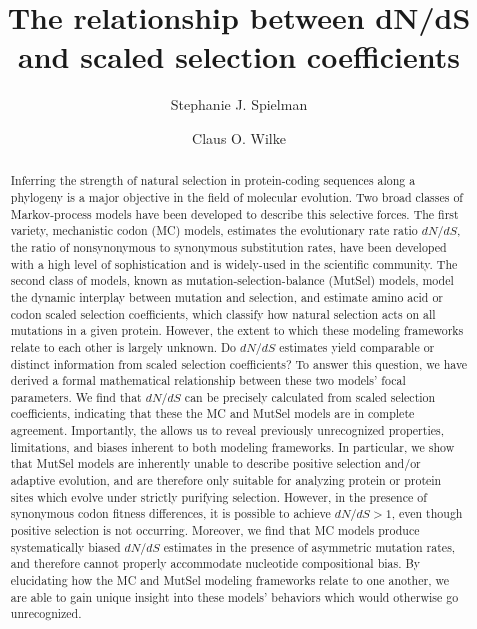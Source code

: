 \documentclass{pnastwo}
\begin{document}
	
	
\title{The relationship between dN/dS and scaled selection coefficients}

\author{Stephanie J. Spielman 
	\and
	Claus O. Wilke}


\maketitle
\begin{article}
	
\begin{abstract} %
Inferring the strength of natural selection in protein-coding sequences along a phylogeny is a major objective in the field of molecular evolution. Two broad classes of Markov-process models have been developed to describe this selective forces. The first variety, mechanistic codon (MC) models, estimates the evolutionary rate ratio $dN/dS$, the ratio of nonsynonymous to synonymous substitution rates, have been developed with a high level of sophistication and is widely-used in the scientific community. The second class of models, known as mutation-selection-balance (MutSel) models, model the dynamic interplay between mutation and selection, and estimate amino acid or codon scaled selection coefficients, which classify how natural selection acts on all mutations in a given protein. However, the extent to which these modeling frameworks relate to each other is largely unknown. Do $dN/dS$ estimates yield comparable or distinct information from scaled selection coefficients? To answer this question, we have derived a formal mathematical relationship between these two models' focal parameters. We find that $dN/dS$ can be precisely calculated from scaled selection coefficients, indicating that these the MC and MutSel models are in complete agreement. Importantly, the  allows us to reveal previously unrecognized properties, limitations, and biases inherent to both modeling frameworks. In particular, we show that MutSel models are inherently unable to describe positive selection and/or adaptive evolution, and are therefore only suitable for analyzing protein or protein sites which evolve under strictly purifying selection. However, in the presence of synonymous codon fitness differences, it is possible to achieve $dN/dS > 1$, even though positive selection is not occurring. Moreover, we find that MC models produce systematically biased $dN/dS$ estimates in the presence of asymmetric mutation rates, and therefore cannot properly accommodate nucleotide compositional bias. By elucidating how the MC and MutSel modeling frameworks relate to one another, we are able to gain unique insight into these models' behaviors which would otherwise go unrecognized.
\end{abstract}


\end{article}
\end{document}
